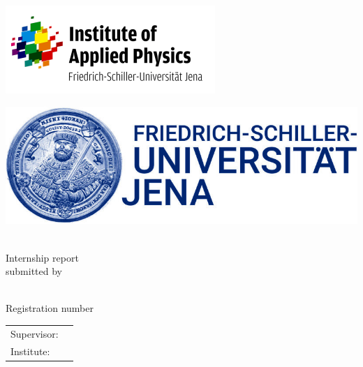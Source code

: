 \thispagestyle{empty}
\begin{titlepage}
\vspace{-8cm}
\begin{minipage}{0.5\textwidth}
	\centering
	\hspace{-2cm}
	\includegraphics[scale=0.6]{Images/Logo IAP.png}
	\end{minipage}
	\hfill
	\begin{minipage}{0.5\textwidth}
	\hspace{1.25cm}
	\includegraphics[scale=0.2]{Images/FSU_Logo.jpg}
\end{minipage}

\vspace{0.5cm}
\begin{center}
	
	\huge
	\textbf{\titel}\\[1cm]
	\Large
	Internship report\\[1cm]
	\large
	submitted by
	
	\Large
	\autor\\[0.5cm]
	\small
	Registration number \matrikelnr\\[2cm]
	
	
	\large
	\begin{tabular}{p{3cm}p{8cm}}\\
		Supervisor: & \quad \betreuer\\
		Institute: & \quad \unternehmen
	\end{tabular}
\end{center}


\end{titlepage}
